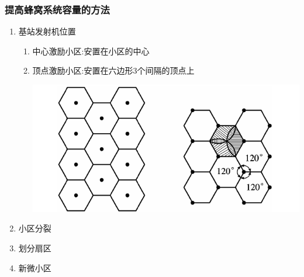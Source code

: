 \documentclass[a4paper ]{report}
\begin{document}
	\subsubsection{提高蜂窝系统容量的方法
	}
	\begin{enumerate}
		\item 	基站发射机位置
		\begin{enumerate}
			\item  中心激励小区:安置在小区的中心
			\item  顶点激励小区:安置在六边形3个间隔的顶点上 \\
			\begin{center}
			\includegraphics[scale=0.7]{基站发射机位置.png}
			\end{center}
		\end{enumerate}
		\item 小区分裂
		\item 划分扇区
		\item 新微小区
	\end{enumerate}
\end{document}
